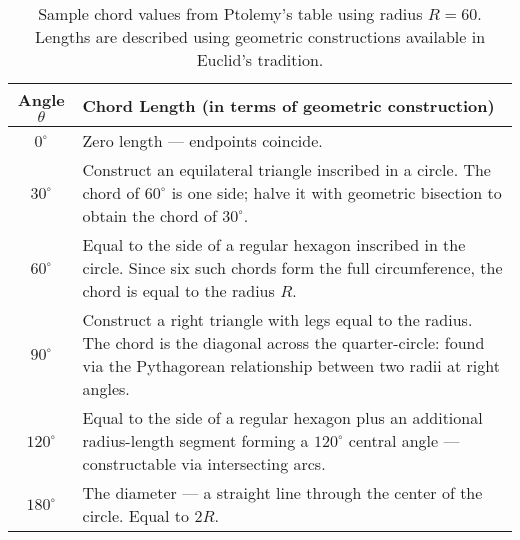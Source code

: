 \begin{table}[H]
\centering
\renewcommand{\arraystretch}{1.5}
\begin{tabular}{|c|p{8cm}|}
\hline
\textbf{Angle \( \theta \)} & \textbf{Chord Length (in terms of geometric construction)} \\
\hline
\( 0^\circ \) & Zero length — endpoints coincide. \\
\hline
\( 30^\circ \) & Construct an equilateral triangle inscribed in a circle. The chord of \( 60^\circ \) is one side; halve it with geometric bisection to obtain the chord of \( 30^\circ \). \\
\hline
\( 60^\circ \) & Equal to the side of a regular hexagon inscribed in the circle. Since six such chords form the full circumference, the chord is equal to the radius \( R \). \\
\hline
\( 90^\circ \) & Construct a right triangle with legs equal to the radius. The chord is the diagonal across the quarter-circle: found via the Pythagorean relationship between two radii at right angles. \\
\hline
\( 120^\circ \) & Equal to the side of a regular hexagon plus an additional radius-length segment forming a \( 120^\circ \) central angle — constructable via intersecting arcs. \\
\hline
\( 180^\circ \) & The diameter — a straight line through the center of the circle. Equal to \( 2R \). \\
\hline
\end{tabular}
\caption{Sample chord values from Ptolemy’s table using radius \( R = 60 \). Lengths are described using geometric constructions available in Euclid’s tradition.}
\end{table}


